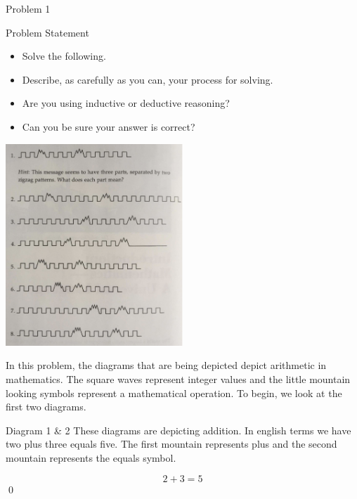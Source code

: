 \begin{problem}{Problem 1}
    \begin{statement}{Problem Statement}
        \begin{itemize}
            \item Solve the following.
            \item Describe, as carefully as you can, your process for solving.
            \item Are you using inductive or deductive reasoning?
            \item Can you be sure your answer is correct?
        \end{itemize}

        \begin{center}
            \includegraphics[width=0.5\textwidth]{./Images/Math Signals.png}
        \end{center}

    \end{statement}

    In this problem, the diagrams that are being depicted depict arithmetic in mathematics. The square waves represent integer values and the little mountain looking symbols represent a mathematical
    operation. To begin, we look at the first two diagrams.


    \begin{highlight}{Diagram 1 \& 2}
        These diagrams are depicting addition. In english terms we have two plus three equals five. The first mountain represents plus and the second mountain represents the equals symbol.

        \setcounter{equation}{0}
        \begin{equation}
            2 + 3 = 5
        \end{equation}
        \qed


\end{highlight}
\end{problem}
